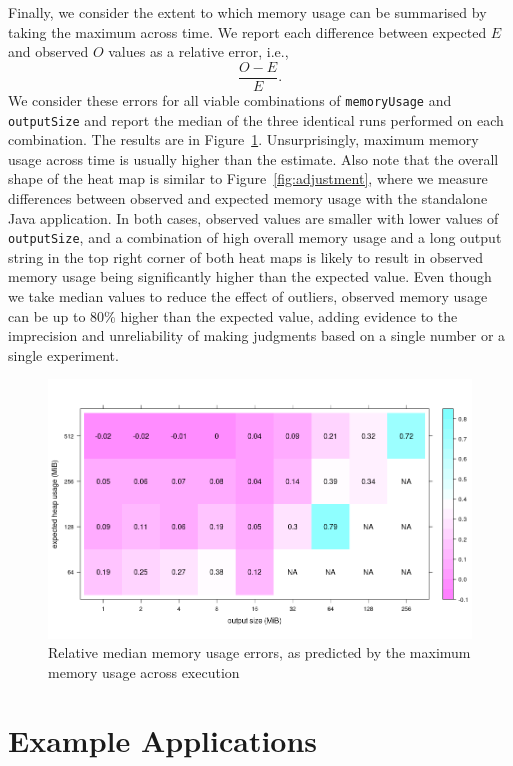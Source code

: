 \documentclass{article}
\begin{document}
Finally, we consider the extent to which memory usage can be summarised by
taking the maximum across time. We report each difference between expected $E$
and observed $O$ values as a relative error, i.e.,
\[
  \frac{O - E}{E}.
\]
We consider these errors for all viable combinations of \texttt{memoryUsage} and
\texttt{outputSize} and report the median of the three identical runs performed
on each combination. The results are in Figure~\ref{fig:relative_errors}.
Unsurprisingly, maximum memory usage across time is usually higher than the
estimate. Also note that the overall shape of the heat map is similar to
Figure~\ref{fig:adjustment}, where we measure differences between observed and
expected memory usage with the standalone Java application. In both cases,
observed values are smaller with lower values of \texttt{outputSize}, and a
combination of high overall memory usage and a long output string in the top
right corner of both heat maps is likely to result in observed memory usage
being significantly higher than the expected value. Even though we take median
values to reduce the effect of outliers, observed memory usage can be up to 80\%
higher than the expected value, adding evidence to the imprecision and
unreliability of making judgments based on a single number or a single
experiment.

\begin{figure}
  \centering
  \includegraphics[width=\textwidth]{../plots/relative_median_errors.png}
  \caption{Relative median memory usage errors, as predicted by the maximum
    memory usage across execution}
  \label{fig:relative_errors}
\end{figure}

\section{Example Applications}



\end{document}

